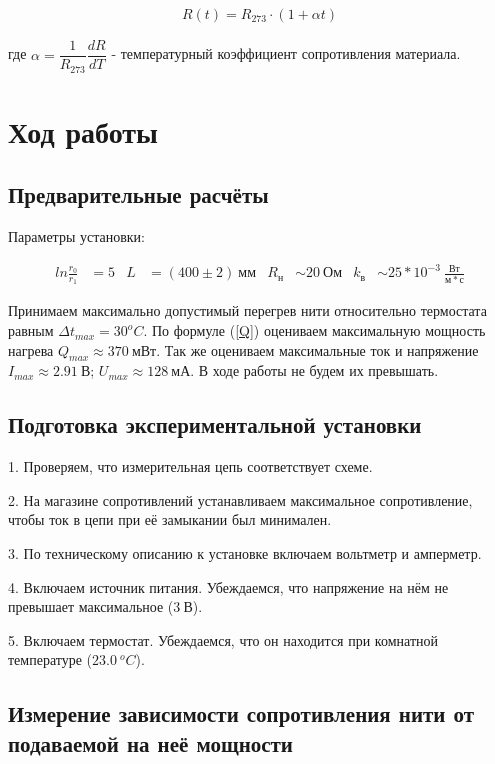 \documentclass[a4paper, 12pt]{article}
\begin{document}
        \begin{align}
            R(t) = R_{273} \cdot (1 + \alpha t) \label{RT}
        \end{align}

        где $\alpha = \dfrac{1}{R_{273}} \dfrac{dR}{dT}$ - температурный коэффициент сопротивления материала.

    \section{Ход работы}

        \subsection{Предварительные расчёты}

            Параметры установки:

            \begin{align*}
                ln \frac{r_0}{r_1} &= 5 & L &= (400 \pm 2)~мм & R_н &\sim 20~Ом & k_в &\sim 25 * 10^{-3}~\frac{Вт}{м*с}
            \end{align*}

            Принимаем максимально допустимый перегрев нити относительно термостата равным $\Delta t_{max} = 30^oC$. По формуле (\ref{Q}) оцениваем максимальную мощность нагрева $Q_{max} \approx 370~мВт$. Так же оцениваем максимальные ток и напряжение $I_{max} \approx 2.91~В$; $U_{max} \approx 128~мА$. В ходе работы не будем их превышать.

        \subsection{Подготовка экспериментальной установки}

            1. Проверяем, что измерительная цепь соответствует схеме.

            2. На магазине сопротивлений устанавливаем максимальное сопротивление, чтобы ток в цепи при её замыкании был минимален.

            3. По техническому описанию к установке включаем вольтметр и амперметр.

            4. Включаем источник питания. Убеждаемся, что напряжение на нём не превышает максимальное ($3~В$).

            5. Включаем термостат. Убеждаемся, что он находится при комнатной температуре ($23.0~^oC$).

        \subsection{Измерение зависимости сопротивления нити от подаваемой на неё мощности}
\end{document}
